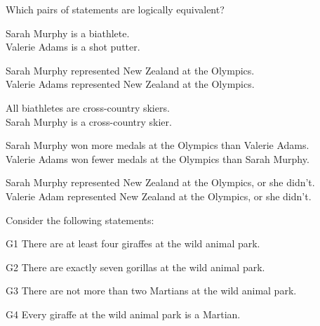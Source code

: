 \documentclass[PHIL101-Textbook.tex]{subfiles}
\begin{document}
\noindent\solutions\problempart \label{pr.EnglishEquivalent}
Which pairs of statements are logically equivalent?
\begin{earg}
\item Sarah Murphy is a biathlete.	\\
  Valerie Adams is a shot putter. 
\item Sarah Murphy represented New Zealand at the Olympics.	\\
  Valerie Adams represented New Zealand at the Olympics.
\item All biathletes are cross-country skiers.	\\
  Sarah Murphy is a cross-country skier.
\item Sarah Murphy won more medals at the Olympics than Valerie Adams.	 \\
 Valerie Adams won fewer medals at the Olympics than Sarah Murphy.
\item Sarah Murphy represented New Zealand at the Olympics, or she didn't.	 \\
 Valerie Adam represented New Zealand at the Olympics, or she didn't.
\end{earg} \pagebreak

\noindent \problempart 
Consider the following statements: 
\begin{ebullet}%
\item[G1] \label{itm:at_least_four}There are at least four giraffes at the wild animal park.
\item[G2] \label{itm:exactly_seven} There are exactly seven gorillas at the wild animal park.
\item[G3] \label{itm:not_more_than_two} There are not more than two Martians at the wild animal park.
\item[G4] \label{itm:martians} Every giraffe at the wild animal park is a Martian.
\end{ebullet}
\end{document}
